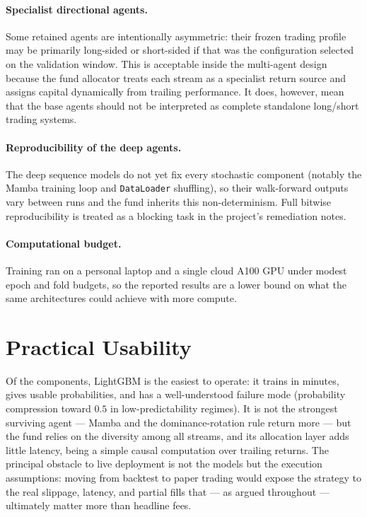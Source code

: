 \paragraph{Specialist directional agents.}
Some retained agents are intentionally asymmetric: their frozen trading profile may be primarily long-sided or short-sided if that was the configuration selected on the validation window. This is acceptable inside the multi-agent design because the fund allocator treats each stream as a specialist return source and assigns capital dynamically from trailing performance. It does, however, mean that the base agents should not be interpreted as complete standalone long/short trading systems.

\paragraph{Reproducibility of the deep agents.}
The deep sequence models do not yet fix every stochastic component (notably the Mamba training loop and \texttt{DataLoader} shuffling), so their walk-forward outputs vary between runs and the fund inherits this non-determinism. Full bitwise reproducibility is treated as a blocking task in the project's remediation notes.

\paragraph{Computational budget.}
Training ran on a personal laptop and a single cloud A100 GPU under modest epoch and fold budgets, so the reported results are a lower bound on what the same architectures could achieve with more compute.

\section{Practical Usability}
\label{sec:practical_usability}

Of the components, LightGBM is the easiest to operate: it trains in minutes, gives usable probabilities, and has a well-understood failure mode (probability compression toward $0.5$ in low-predictability regimes). It is not the strongest surviving agent --- Mamba and the dominance-rotation rule return more --- but the fund relies on the diversity among all streams, and its allocation layer adds little latency, being a simple causal computation over trailing returns. The principal obstacle to live deployment is not the models but the execution assumptions: moving from backtest to paper trading would expose the strategy to the real slippage, latency, and partial fills that --- as argued throughout --- ultimately matter more than headline fees.
